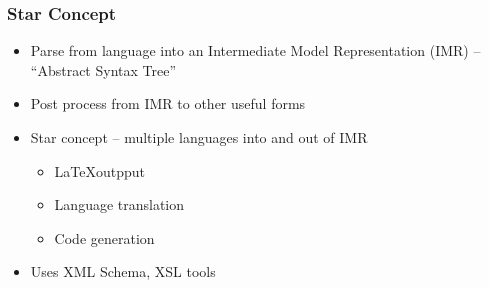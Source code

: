 \documentclass[tikz]{beamer}
\begin{document}

\begin{frame}
  \frametitle{Star Concept}
  \begin{itemize}
 \item Parse from language into an Intermediate Model Representation (IMR)
 -- ``Abstract Syntax Tree'' 
  \item Post process from IMR to other useful forms
  \item Star concept --  multiple languages into and out of IMR
    \begin{itemize}
    \item \LaTeX outpput
    \item Language translation
    \item Code generation
    \end{itemize}

  \item Uses XML Schema, XSL tools
  \end{itemize}

\end{frame}
\end{document}
